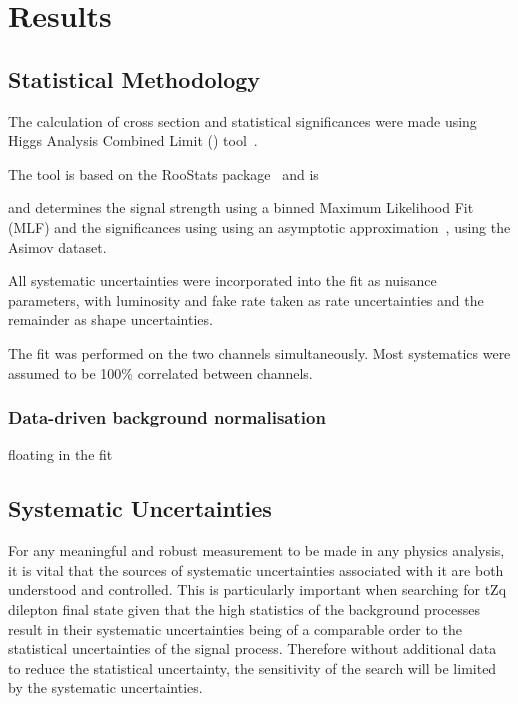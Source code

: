 \chapter{Results}\label{chapter:results}


\section{Statistical Methodology}\label{sec:statisticalModel}
The calculation of cross section and statistical significances were made using Higgs Analysis Combined Limit (\combine) tool~\cite{Combine}.

The \combine tool is based on the RooStats package~\cite{Moneta:2010pm,Schott:2012zb} and is 

and determines the signal strength using a binned Maximum Likelihood Fit (MLF) and the significances using using an asymptotic approximation~\cite{AsymptoticFormulae}, using the Asimov dataset.



All systematic uncertainties were incorporated into the fit as nuisance parameters, with luminosity and fake rate taken as rate uncertainties and the remainder as shape uncertainties.
 
The fit was performed on the two channels simultaneously. 
Most systematics were assumed to be 100\% correlated between channels.

\subsection{Data-driven background normalisation}\label{subsec:combineNormalisation}
floating in the fit


\section{Systematic Uncertainties}\label{chapter:systematics}
For any meaningful and robust measurement to be made in any physics analysis, it is vital that the sources of systematic uncertainties associated with it are both understood and controlled.
This is particularly important when searching for tZq dilepton final state given that the high statistics of the background processes result in their systematic uncertainties being of a comparable order to the statistical uncertainties of the signal process.
Therefore without additional data to reduce the statistical uncertainty, the sensitivity of the search will be limited by the systematic uncertainties.

